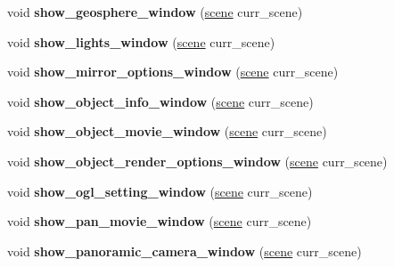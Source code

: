 \begin{DoxyCompactItemize}
\item 
\mbox{\label{classts__gui_a6e22df586f00adfff494b81d8fd63f6c}} 
void {\bfseries show\+\_\+geosphere\+\_\+window} (\hyperlink{classscene}{scene} curr\+\_\+scene)
\item 
\mbox{\label{classts__gui_a6da2913cc1f9a21a1c5d2fa545a8e2be}} 
void {\bfseries show\+\_\+lights\+\_\+window} (\hyperlink{classscene}{scene} curr\+\_\+scene)
\item 
\mbox{\label{classts__gui_a90e06655cd7480169b53175e6f26a29b}} 
void {\bfseries show\+\_\+mirror\+\_\+options\+\_\+window} (\hyperlink{classscene}{scene} curr\+\_\+scene)
\item 
\mbox{\label{classts__gui_a0b98aaa21ca53800856eabfd9deebbdd}} 
void {\bfseries show\+\_\+object\+\_\+info\+\_\+window} (\hyperlink{classscene}{scene} curr\+\_\+scene)
\item 
\mbox{\label{classts__gui_a1427cf6866f72a6bd8505b636d21e1d5}} 
void {\bfseries show\+\_\+object\+\_\+movie\+\_\+window} (\hyperlink{classscene}{scene} curr\+\_\+scene)
\item 
\mbox{\label{classts__gui_ad4243c90c18a98418458db03fb084110}} 
void {\bfseries show\+\_\+object\+\_\+render\+\_\+options\+\_\+window} (\hyperlink{classscene}{scene} curr\+\_\+scene)
\item 
\mbox{\label{classts__gui_a3997be6e5d94939c2877e431c6b47a12}} 
void {\bfseries show\+\_\+ogl\+\_\+setting\+\_\+window} (\hyperlink{classscene}{scene} curr\+\_\+scene)
\item 
\mbox{\label{classts__gui_a5961b00dd5e183dfe580021144dbbeb7}} 
void {\bfseries show\+\_\+pan\+\_\+movie\+\_\+window} (\hyperlink{classscene}{scene} curr\+\_\+scene)
\item 
\mbox{\label{classts__gui_a28bb1a4d7479de4c974525ee3e70b707}} 
void {\bfseries show\+\_\+panoramic\+\_\+camera\+\_\+window} (\hyperlink{classscene}{scene} curr\+\_\+scene)
\item 
\mbox{\label{classts__gui_a7619c5f31fcdf1e1437ef233b7c4cc17}} 

\end{DoxyCompactItemize}
